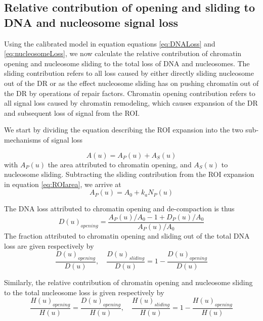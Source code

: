 \documentclass[12pt]{article}
\begin{document}
\subsection{Relative contribution of opening and sliding to DNA
	and nucleosome signal loss}

Using the calibrated model in equation equations \eqref{eq:DNALoss}  and \eqref{eq:nucleosomeLoss}, we now calculate the
relative contribution of chromatin opening and nucleosome sliding to the
total loss of DNA and nucleosomes. The sliding contribution refers to all loss
caused by either directly sliding nucleosome out of the DR or as the effect
nucleosome sliding has on pushing chromatin out of the DR by operations
of repair factors. Chromatin opening contribution refers to all signal loss
caused by chromatin remodeling, which causes expansion of the DR and
subsequent loss of signal from the ROI.

We start by dividing the equation describing the ROI expansion into the
two sub-mechanisms of signal loss

\begin{equation*}
A(u) = A_P(u) +A_S(u)
\end{equation*}
with $A_P(u)$ the area attributed to chromatin opening, and $A_S(u)$ to nucleosome sliding. Subtracting the sliding contribution from the ROI expansion
in equation \eqref{eq:ROIarea}, we arrive at
\begin{equation*}
A_P(u) = A_0 + k_aN_P(u)
\end{equation*}

The DNA loss attributed to chromatin opening and de-compaction is thus
\begin{equation*}
D(u)_{opening}= \frac{A_P(u)/A_0 -1 +D_P(u)/A_0}{A_P(u)/A_0}
\end{equation*}	
The fraction attributed to chromatin opening and sliding out of the total
DNA loss are given respectively by
\begin{equation}\label{eq:relativeOpeningSlidingDNA}
\frac{D(u)_{opening}}{D(u)}, \quad \frac{D(u)_{sliding}}{D(u)}=1-\frac{D(u)_{opening}}{D(u)}
\end{equation}

Similarly, the relative contribution of chromatin opening and nucleosome
sliding to the total nucleosome loss is given respectively by
\begin{equation}\label{eq:relativeOpeningSlidingNucleosomes}
\frac{H(u)_{opening}}{H(u)} = \frac{D(u)_{opening}}{H(u)},\quad \frac{H(u)_{sliding}}{H(u)}=1-\frac{H(u)_{opening}}{H(u)}
\end{equation}
\end{document}
